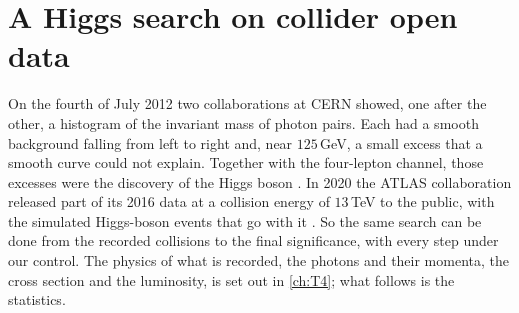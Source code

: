 \section{A Higgs search on collider open data}
\label{13d:sec:question}

On the fourth of July 2012 two collaborations at CERN showed, one after the other, a
histogram of the invariant mass of photon pairs. Each had a smooth background falling from
left to right and, near $125\,$GeV, a small excess that a smooth curve could not explain.
Together with the four-lepton channel, those excesses were the discovery of the Higgs
boson \cite{AadHiggs2012,ChatrchyanHiggs2012}. In 2020 the ATLAS collaboration released
part of its 2016 data at a collision energy of $13\,$TeV to the public, with the simulated
Higgs-boson events that go with it \cite{ATLASOpenData2020,SerkinOpenData2020}. So the
same search can be done from the recorded collisions to the final significance, with every
step under our control. The physics of what is recorded, the photons and their momenta,
the cross section and the luminosity, is set out in \cref{ch:T4}; what follows is the
statistics.

